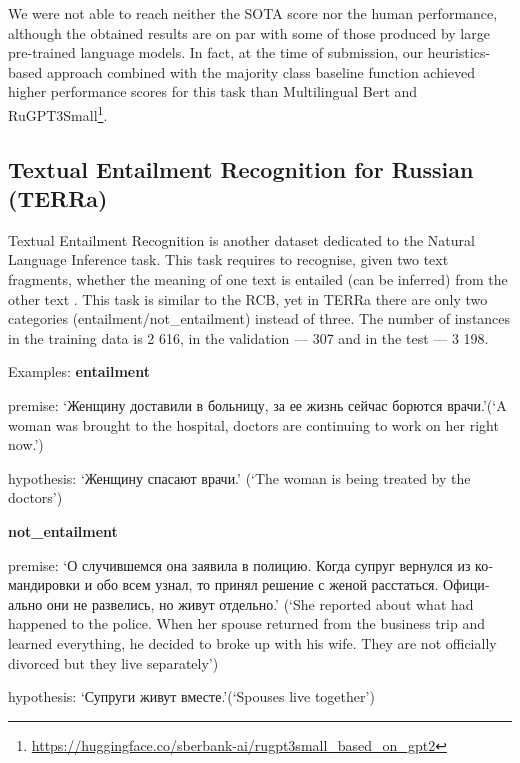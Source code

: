 \documentclass[11pt]{article}
\begin{document}
We were not able to reach neither the SOTA score nor the human performance, although the obtained results are on par with some of those produced by large pre-trained language models. In fact, at the time of submission, our heuristics-based approach combined with the majority class baseline function achieved higher performance scores for this task than Multilingual Bert and RuGPT3Small\footnote{\url{https://huggingface.co/sberbank-ai/rugpt3small_based_on_gpt2}}.

\subsection{Textual Entailment Recognition for Russian (TERRa)}

Textual Entailment Recognition is another dataset dedicated to the Natural Language Inference task. This task requires to recognise, given two text fragments, whether the meaning of one text is entailed (can be inferred) from the other text \cite{shavrina-etal-2020-russiansuperglue}. This task is similar to the RCB, yet in TERRa there are only two categories (entailment/not\_entailment) instead of three.
The number of instances in the training data is 2 616, in the validation --- 307 and in the test --- 3 198. 

\begin{flushleft}
Examples:
\textbf{entailment}

premise: \foreignlanguage{russian}{`Женщину доставили в больницу, за ее жизнь сейчас борются врачи.'}(`A woman was brought to the hospital, doctors are continuing to work on her right now.')

hypothesis: \foreignlanguage{russian}{`Женщину спасают врачи.'} (`The woman is being treated by the doctors')

\textbf{not\_entailment}

premise: \foreignlanguage{russian}{`О случившемся она заявила в полицию. Когда супруг вернулся из командировки и обо всем узнал, то принял решение с женой расстаться. Официально они не развелись, но живут отдельно.'} (`She reported about what had happened to the police. When her spouse returned from the business trip and learned everything, he decided to broke up with his wife. They are not officially divorced but they live separately')

hypothesis: \foreignlanguage{russian}{`Супруги живут вместе.'}(`Spouses live together')

\end{flushleft}
\end{document}

